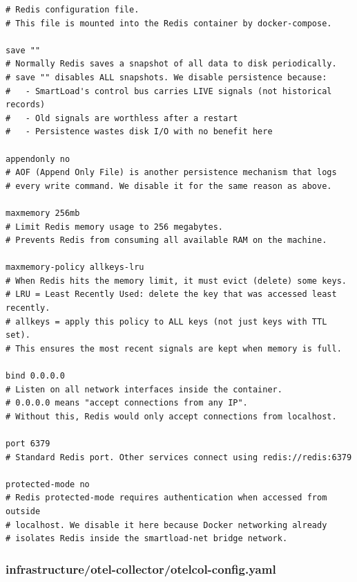 \documentclass[12pt, a4paper]{article}
\begin{document}
\begin{lstlisting}[style=bash, caption={infrastructure/redis/redis.conf}]
# Redis configuration file.
# This file is mounted into the Redis container by docker-compose.

save ""
# Normally Redis saves a snapshot of all data to disk periodically.
# save "" disables ALL snapshots. We disable persistence because:
#   - SmartLoad's control bus carries LIVE signals (not historical records)
#   - Old signals are worthless after a restart
#   - Persistence wastes disk I/O with no benefit here

appendonly no
# AOF (Append Only File) is another persistence mechanism that logs
# every write command. We disable it for the same reason as above.

maxmemory 256mb
# Limit Redis memory usage to 256 megabytes.
# Prevents Redis from consuming all available RAM on the machine.

maxmemory-policy allkeys-lru
# When Redis hits the memory limit, it must evict (delete) some keys.
# LRU = Least Recently Used: delete the key that was accessed least recently.
# allkeys = apply this policy to ALL keys (not just keys with TTL set).
# This ensures the most recent signals are kept when memory is full.

bind 0.0.0.0
# Listen on all network interfaces inside the container.
# 0.0.0.0 means "accept connections from any IP".
# Without this, Redis would only accept connections from localhost.

port 6379
# Standard Redis port. Other services connect using redis://redis:6379

protected-mode no
# Redis protected-mode requires authentication when accessed from outside
# localhost. We disable it here because Docker networking already
# isolates Redis inside the smartload-net bridge network.
\end{lstlisting}

\subsubsection{infrastructure/otel-collector/otelcol-config.yaml}
\end{document}
